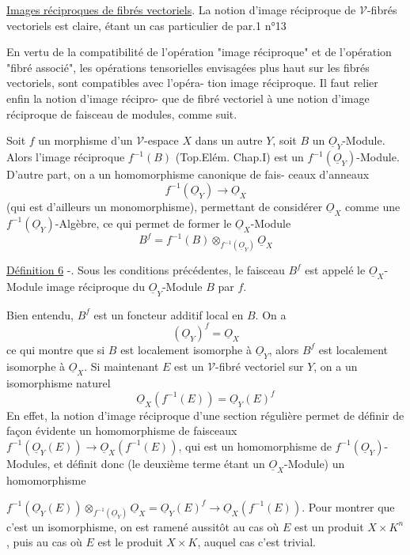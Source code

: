 \underline{Images réciproques de fibrés vectoriels}. La notion d'image réciproque de
$\mathcal{V}$-fibrés vectoriels est claire, étant un cas particulier de par.1 n°13

\newpage



En vertu de la compatibilité de l'opération "image réciproque" et de
l'opération "fibré associé", les opérations tensorielles envisagées
plus haut sur les fibrés vectoriels, sont compatibles avec l'opéra-
tion image réciproque. Il faut relier enfin la notion d'image récipro-
que de fibré vectoriel à une notion d'image réciproque de faisceau de
modules, comme suit.

Soit $f$ un morphisme d'un $\mathcal{V}$-espace $X$ dans un autre $Y$, soit $B$ un
$\underline{O}_Y$-Module. Alors l'image réciproque $f^{-1}(B)$ (Top.Elém. Chap.I) est un
$f^{-1}(\underline{O}_Y)$-Module. D'autre part, on a un homomorphisme canonique de fais-
ceaux d'anneaux
$$f^{-1}(\underline{O}_Y) \to \underline{O}_X$$
(qui est d'ailleurs un monomorphisme), permettant de considérer $\underline{O}_X$
comme une $f^{-1}(\underline{O}_Y)$-Algèbre, ce qui permet de former le $\underline{O}_X$-Module
$$B^f = f^{-1}(B) \otimes_{f^{-1}(\underline{O}_Y)} \underline{O}_X$$

\underline{Définition 6} -. Sous les conditions précédentes, le faisceau $B^f$ est
appelé le $\underline{O}_X$-Module image réciproque du $\underline{O}_Y$-Module $B$ par $f$.

Bien entendu, $B^f$ est un foncteur additif local en $B$. On a
$$(\underline{O}_Y)^f = \underline{O}_X$$
ce qui montre que si $B$ est localement isomorphe à $\underline{O}_Y$, alors $B^f$ est
localement isomorphe à $\underline{O}_X$. Si maintenant $E$ est un $\mathcal{V}$-fibré vectoriel
sur $Y$, on a un isomorphisme naturel
$$\underline{O}_X(f^{-1}(E)) = \underline{O}_Y(E)^f$$
En effet, la notion d'image réciproque d'une section régulière permet
de définir de façon évidente un homomorphisme de faisceaux
$f^{-1}(\underline{O}_Y(E)) \to \underline{O}_X(f^{-1}(E))$, qui est un homomorphisme de $f^{-1}(\underline{O}_Y)$-Modules,
et définit donc (le deuxième terme étant un $\underline{O}_X$-Module) un homomorphisme

\newpage



$f^{-1}(\underline{O}_Y(E)) \otimes_{f^{-1}(\underline{O}_Y)} \underline{O}_X = \underline{O}_Y(E)^f \rightarrow \underline{O}_X(f^{-1}(E))$. Pour montrer que c'est un
isomorphisme, on est ramené aussitôt au cas où $E$ est un produit $X \times K^n$,
puis au cas où $E$ est le produit $X \times K$, auquel cas c'est trivial.

